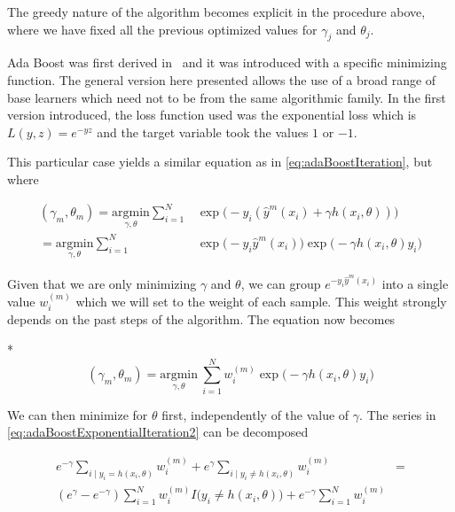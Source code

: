 The greedy nature of the algorithm becomes explicit in the procedure above, where we have fixed all the previous optimized values for $\gamma_j$ and $\theta_j$.

Ada Boost was first derived in~\cite{schapire-adaBoost} and it was introduced with a specific minimizing function. 
The general version here presented allows the use of a broad range of base learners which need not to be from the same algorithmic family. 
In the first version introduced, the loss function used was the exponential loss which is $L(y,z) = e^{-yz}$ and the target variable took the values $1$ or $-1$.

This particular case yields a similar equation as in \cref{eq:adaBoostIteration}, but where

\begin{equation}\label{eq:sadaBoostExponentialIteration}
\begin{split}
(\gamma_{m}, \theta_{m}) = \underset{\gamma, \theta}{\mathrm{argmin}} \sum_{i=1}^{N} & \exp\big( -y_i (\hat{y}^{m}(x_i) + \gamma h(x_i,\theta) )\big) \\
= \underset{\gamma, \theta}{\mathrm{argmin}} \sum_{i=1}^{N} &
\exp\big( -y_i \hat{y}^{m}(x_i)\big) \exp\big(- \gamma h(x_i,\theta)y_i \big)
\end{split}
\end{equation}


Given that we are only minimizing $\gamma$ and $\theta$, we can group $e^{-y_i \hat{y}^{m}(x_i)}$ into a single value $w_i^{(m)}$ which we will set to the weight of each sample. 
This weight strongly depends on the past steps of the algorithm. 
The equation now becomes

*
\begin{equation}\label{eq:adaBoostExponentialIteration2}
(\gamma_{m}, \theta_{m}) = \underset{\gamma, \theta}{\mathrm{argmin}} \  \sum_{i=1}^{N} w_i^{(m)} \exp \big(-\gamma h(x_i,\theta)y_i \big)
\end{equation}

We can then minimize for $\theta$ first, independently of the value of $\gamma$. 
The series in \cref{eq:adaBoostExponentialIteration2} can be decomposed

\begin{equation}\label{eq:adaBoostThetaDecomposition}
\begin{split}
e^{-\gamma} \sum_{i \mid y_i = h(x_i,\theta)} w_i^{(m)} + e^{\gamma} \sum_{i \mid y_i \neq h(x_i,\theta)} w_i^{(m)} & = \\
( e^{\gamma} - e^{-\gamma}) \sum_{i = 1}^{N} w_i^{(m)} I \big( y_i \neq h(x_i,\theta)  \big) + e^{-\gamma} \sum_{i = 1}^{N}  w_i^{(m)} &
\end{split}
\end{equation}



